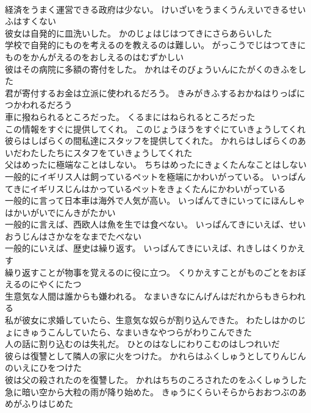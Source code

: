 \documentclass[8pt]{extreport}
\begin{document}
\begin{CJK}{UTF8}{min}
\\	経済をうまく運営できる政府は少ない。	けいざいをうまくうんえいできるせいふはすくない 
\\	彼女は自発的に皿洗いした。	かのじょはじはつてきにさらあらいした 
\\	学校で自発的にものを考えるのを教えるのは難しい。	がっこうでじはつてきにものをかんがえるのをおしえるのはむずかしい 
\\	彼はその病院に多額の寄付をした。	かれはそのびょういんにたがくのきふをした 
\\	君が寄付するお金は立派に使われるだろう。	きみがきふするおかねはりっぱにつかわれるだろう 
\\	車に撥ねられるところだった。	くるまにはねられるところだった 
\\	この情報をすぐに提供してくれ。	このじょうほうをすぐにていきょうしてくれ 
\\	彼らはしばらくの間私達にスタッフを提供してくれた。	かれらはしばらくのあいだわたしたちにスタフをていきょうしてくれた 
\\	父はめったに極端なことはしない。	ちちはめったにきょくたんなことはしない 
\\	一般的にイギリス人は飼っているペットを極端にかわいがっている。	いっぱんてきにイギリスじんはかっているペットをきょくたんにかわいがっている 
\\	一般的に言って日本車は海外で人気が高い。	いっぱんてきにいってにほんしゃはかいがいでにんきがたかい 
\\	一般的に言えば、西欧人は魚を生では食べない。	いっぱんてきにいえば、せいおうじんはさかなをなまでたべない 
\\	一般的にいえば、歴史は繰り返す。	いっぱんてきにいえば、れきしはくりかえす 
\\	繰り返すことが物事を覚えるのに役に立つ。	くりかえすことがものごとをおぼえるのにやくにたつ 
\\	生意気な人間は誰からも嫌われる。	なまいきなにんげんはだれからもきらわれる 
\\	私が彼女に求婚していたら、生意気な奴らが割り込んできた。	わたしはかのじょにきゅうこんしていたら、なまいきなやつらがわりこんできた 
\\	人の話に割り込むのは失礼だ。	ひとのはなしにわりこむのはしつれいだ 
\\	彼らは復讐として隣人の家に火をつけた。	かれらはふくしゅうとしてりんじんのいえにひをつけた 
\\	彼は父の殺されたのを復讐した。	かれはちちのころされたのをふくしゅうした 
\\	急に暗い空から大粒の雨が降り始めた。	きゅうにくらいそらからおおつぶのあめがふりはじめた 

\end{CJK}
\end{document}
